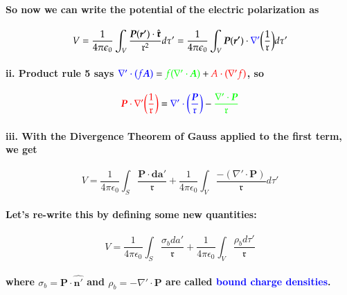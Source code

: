 \documentclass{article}
\begin{document}
\paragraph{So now we can write the potential of the electric polarization as }
\begin{equation*}
    V=\frac{1}{4\pi\epsilon_0}\int_V \frac{\boldsymbol{P}(\boldsymbol{r'})\cdot \hat{\boldsymbol{\mathfrak{r}}}}{\mathfrak{r}^2}d\tau'=\frac{1}{4\pi\epsilon_0}\int_V \boldsymbol{P}(\boldsymbol{r'})\cdot \textcolor{blue}{\nabla'}\bigg(\frac{1}{\mathfrak{r}}\bigg) d\tau'
\end{equation*}
\paragraph{\indent \indent ii. Product rule 5 says $\textcolor{blue}{\nabla'\cdot (f\boldsymbol{A})}=\textcolor{green}{f(\nabla'\cdot\boldsymbol{A})}+\textcolor{red}{A\cdot (\nabla'f)}$, so}
\begin{equation*}
    \textcolor{red}{\boldsymbol{P}\cdot \nabla'\bigg(\frac{1}{\mathfrak{r}}\bigg)}=\textcolor{blue}{\nabla'\cdot \bigg(\frac{\boldsymbol{P}}{\mathfrak{r}}\bigg)}-\textcolor{green}{\frac{\nabla'\cdot \boldsymbol{P}}{\mathfrak{r}}}
\end{equation*}
\paragraph{\indent \indent iii. With the Divergence Theorem of Gauss applied to the first term, we get}
\begin{equation*}
    V=\frac{1}{4\pi\epsilon_0}\int_S \frac{\boldsymbol{P}\cdot \boldsymbol{da'}}{\mathfrak{r}}+\frac{1}{4\pi\epsilon_0}\int_V \frac{-(\nabla'\cdot\boldsymbol{P})}{\mathfrak{r}}d\tau'
\end{equation*}
\paragraph{Let's re-write this by defining some new quantities:}
\begin{equation*}
    V=\frac{1}{4\pi\epsilon_0}\int_S \frac{\sigma_b da'}{\mathfrak{r}}+\frac{1}{4\pi\epsilon_0}\int_V\frac{\rho_b d\tau'}{\mathfrak{r}}
\end{equation*}
\paragraph{where $\sigma_b=\boldsymbol{P}\cdot\hat{\boldsymbol{n'}}$ and $\rho_b=-\nabla'\cdot \boldsymbol{P}$ are called \textcolor{blue}{bound charge densities}.}
\end{document}
